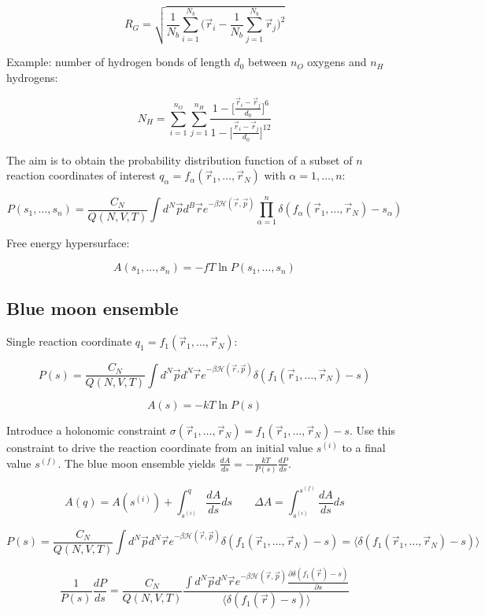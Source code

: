$$R_G = \sqrt{\frac{1}{N_b}\sum\limits_{i=1}^{N_b}\biggl(\vec{r}_i-\frac{1}{N_b}\sum\limits_{j=1}^{N_b}\vec{r}_j\biggr)^2}$$

Example: number of hydrogen bonds of length $d_0$ between $n_O$ oxygens and $n_H$ hydrogens:

$$N_H = \sum\limits_{i=1}^{n_O}\sum\limits_{j=1}^{n_H}\frac{1-\biggl[\frac{\vec{r}_i-\vec{r}_j}{d_0}\biggr]^6}{1-\biggl[\frac{\vec{r}_i-\vec{r}_j}{d_0}\biggr]^{12}}$$

The aim is to obtain the probability distribution function of a subset of $n$ reaction coordinates of interest $q_\alpha= f_\alpha(\vec{r}_1, \dots, \vec{r}_N)$ with $\alpha = 1, \dots, n$:

$$P(s_1, \dots, s_n) = \frac{C_N}{Q(N, V, T)}\int d^N\vec{p}d^B\vec{r}e^{-\beta\mathcal{H}(\vec{r}, \vec{p})}\prod\limits_{\alpha=1}^n\delta(f_\alpha(\vec{r}_1, \dots, \vec{r}_N)-s_\alpha)$$

Free energy hypersurface:

$$A(s_1, \dots, s_n) = -fT\ln P(s_1, \dots, s_n)$$

	\subsection{Blue moon ensemble}
	Single reaction coordinate $q_1 = f_1(\vec{r}_1, \dots, \vec{r}_N)$:

	$$P(s) = \frac{C_N}{Q(N, V, T)}\int d^N\vec{p}d^N\vec{r}e^{-\beta\mathcal{H}(\vec{r}, \vec{p})}\delta(f_1(\vec{r}_1, \dots, \vec{r}_N)-s)$$

	$$A(s) = -kT\ln P(s)$$

	Introduce a holonomic constraint $\sigma(\vec{r}_1, \dots, \vec{r}_N) = f_1(\vec{r}_1, \dots, \vec{r}_N)-s$.
	Use this constraint to drive the reaction coordinate from an initial value $s^{(i)}$ to a final value $s^{(f)}$.
	The blue moon ensemble yields $\frac{dA}{ds} = -\frac{kT}{P(s)}\frac{dP}{ds}$.

	$$A(q) = A(s^{(i)}) + \int_{s^{(i)}}^q\frac{dA}{ds}ds\qquad \Delta A = \int_{s^{(i)}}^{s^{(f)}}\frac{dA}{ds}ds$$

	$$P(s) = \frac{C_N}{Q(N, V, T)}\int d^N\vec{p}d^N\vec{r}e^{-\beta\mathcal{H}(\vec{r}, \vec{p})}\delta(f_1(\vec{r}_1, \dots, \vec{r}_N)-s) = \langle\delta(f_1(\vec{r}_1, \dots, \vec{r}_N)-s)\rangle$$

	$$\frac{1}{P(s)}\frac{dP}{ds} = \frac{C_N}{Q(N, V, T)}\frac{\int d^N\vec{p}d^N\vec{r}e^{-\beta\mathcal{H}(\vec{r}, \vec{p})}\frac{\partial\delta(f_1(\vec{r})-s)}{\partial s}}{\langle\delta(f_1(\vec{r})-s)\rangle}$$

